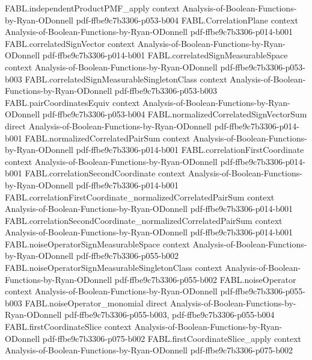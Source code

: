 \begin{theorem}
\proofstep
  {FABL.independentProductPMF_apply}
  {context}
  {Analysis-of-Boolean-Functions-by-Ryan-ODonnell}
  {pdf-ffbe9c7b3306-p053-b004}
\proofstep
  {FABL.CorrelationPlane}
  {context}
  {Analysis-of-Boolean-Functions-by-Ryan-ODonnell}
  {pdf-ffbe9c7b3306-p014-b001}
\proofstep
  {FABL.correlatedSignVector}
  {context}
  {Analysis-of-Boolean-Functions-by-Ryan-ODonnell}
  {pdf-ffbe9c7b3306-p014-b001}
\proofstep
  {FABL.correlatedSignMeasurableSpace}
  {context}
  {Analysis-of-Boolean-Functions-by-Ryan-ODonnell}
  {pdf-ffbe9c7b3306-p053-b003}
\proofstep
  {FABL.correlatedSignMeasurableSingletonClass}
  {context}
  {Analysis-of-Boolean-Functions-by-Ryan-ODonnell}
  {pdf-ffbe9c7b3306-p053-b003}
\proofstep
  {FABL.pairCoordinatesEquiv}
  {context}
  {Analysis-of-Boolean-Functions-by-Ryan-ODonnell}
  {pdf-ffbe9c7b3306-p053-b004}
\proofstep
  {FABL.normalizedCorrelatedSignVectorSum}
  {direct}
  {Analysis-of-Boolean-Functions-by-Ryan-ODonnell}
  {pdf-ffbe9c7b3306-p014-b001}
\proofstep
  {FABL.normalizedCorrelatedPairSum}
  {context}
  {Analysis-of-Boolean-Functions-by-Ryan-ODonnell}
  {pdf-ffbe9c7b3306-p014-b001}
\proofstep
  {FABL.correlationFirstCoordinate}
  {context}
  {Analysis-of-Boolean-Functions-by-Ryan-ODonnell}
  {pdf-ffbe9c7b3306-p014-b001}
\proofstep
  {FABL.correlationSecondCoordinate}
  {context}
  {Analysis-of-Boolean-Functions-by-Ryan-ODonnell}
  {pdf-ffbe9c7b3306-p014-b001}
\proofstep
  {FABL.correlationFirstCoordinate_normalizedCorrelatedPairSum}
  {context}
  {Analysis-of-Boolean-Functions-by-Ryan-ODonnell}
  {pdf-ffbe9c7b3306-p014-b001}
\proofstep
  {FABL.correlationSecondCoordinate_normalizedCorrelatedPairSum}
  {context}
  {Analysis-of-Boolean-Functions-by-Ryan-ODonnell}
  {pdf-ffbe9c7b3306-p014-b001}
\proofstep
  {FABL.noiseOperatorSignMeasurableSpace}
  {context}
  {Analysis-of-Boolean-Functions-by-Ryan-ODonnell}
  {pdf-ffbe9c7b3306-p055-b002}
\proofstep
  {FABL.noiseOperatorSignMeasurableSingletonClass}
  {context}
  {Analysis-of-Boolean-Functions-by-Ryan-ODonnell}
  {pdf-ffbe9c7b3306-p055-b002}
\proofstep
  {FABL.noiseOperator}
  {context}
  {Analysis-of-Boolean-Functions-by-Ryan-ODonnell}
  {pdf-ffbe9c7b3306-p055-b003}
\proofstep
  {FABL.noiseOperator_monomial}
  {direct}
  {Analysis-of-Boolean-Functions-by-Ryan-ODonnell}
  {pdf-ffbe9c7b3306-p055-b003,
    pdf-ffbe9c7b3306-p055-b004}
\proofstep
  {FABL.firstCoordinateSlice}
  {context}
  {Analysis-of-Boolean-Functions-by-Ryan-ODonnell}
  {pdf-ffbe9c7b3306-p075-b002}
\proofstep
  {FABL.firstCoordinateSlice_apply}
  {context}
  {Analysis-of-Boolean-Functions-by-Ryan-ODonnell}
  {pdf-ffbe9c7b3306-p075-b002}

\end{theorem}
